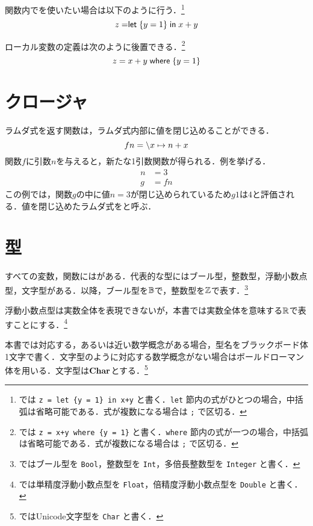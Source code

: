 \documentclass[platex,a5paper,twoside,fleqn,draft]{jsbook}
\newcommand{\keyword}[1]{\textgt{#1}}
\begin{document}
関数内で\keyword{ローカル変数}を使いたい場合は以下のように行う．\footnote{\haskell では \verb|z = let {y = 1} in x+y| と書く．\verb|let| 節内の式がひとつの場合，中括弧は省略可能である．式が複数になる場合は \verb|;| で区切る．}
\begin{equation}
z=\mathrel{\textsf{let}}\left\{y=1\right\}\mathrel{\textsf{in}}x+y
\end{equation}

ローカル変数の定義は次のように後置できる．\footnote{\haskell では \verb|z = x+y where {y = 1}| と書く．\verb|where| 節内の式が一つの場合，中括弧は省略可能である．式が複数になる場合は \verb|;| で区切る．}
\begin{equation}
z=x+y\mathrel{\textsf{where}}\left\{y=1\right\}
\end{equation}

\section{クロージャ}

ラムダ式を返す関数は，ラムダ式内部に値を閉じ込めることができる．
\begin{equation}
fn=\backslash x\mapsto n+x
\end{equation}
関数$f$に引数$n$を与えると，新たな1引数関数が得られる．例を挙げる．
\begin{align}
n&=3\\
g&=fn
\end{align}
この例では，関数$g$の中に値$n=3$が閉じ込められているため$g1$は$4$と評価される．値を閉じ込めたラムダ式を\keyword{クロージャ}と呼ぶ．

\section{型}

すべての変数，関数には\keyword{型}がある．代表的な型にはブール型，整数型，浮動小数点型，文字型がある．以降，ブール型を$\mathord{\mathbb{B}}$で，整数型を$\mathord{\mathbb{Z}}$で表す．\footnote{\haskell ではブール型を \verb|Bool|，整数型を \verb|Int|，多倍長整数型を \verb|Integer| と書く．}

浮動小数点型は実数全体を表現できないが，本書では実数全体を意味する$\mathord{\mathbb{R}}$で表すことにする．\footnote{\haskell では単精度浮動小数点型を \verb|Float|，倍精度浮動小数点型を \verb|Double| と書く．}

本書では対応する，あるいは近い数学概念がある場合，型名をブラックボード体1文字で書く．文字型のように対応する数学概念がない場合はボールドローマン体を用いる．文字型は$\mathbf{Char}$とする．\footnote{\haskell ではUnicode文字型を \verb|Char| と書く．}
\end{document}
